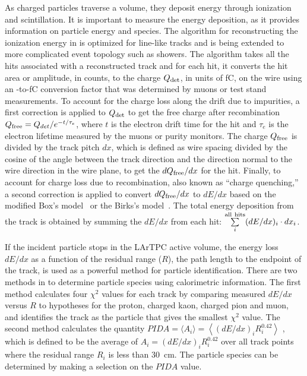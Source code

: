 As charged particles traverse a \lar{} volume, they deposit energy through ionization and scintillation. It is important to measure the energy deposition, as it provides information on particle energy and species. The algorithm for reconstructing the ionization energy in  is optimized for line-like tracks and is being extended to more complicated event topology such as showers. The algorithm takes all the hits associated with a reconstructed track and for %
each hit, it converts the hit area or amplitude, in  counts, %
to the charge $Q_{\rm det}$, in units of \si{\femto\coulomb}, on the wire using an -to-\si{\femto\coulomb} conversion factor that was determined by muons or test stand measurements. To account for the charge loss along the drift due to impurities, a first correction is applied to $Q_{\rm det}$ to get the free charge after recombination $Q_{\rm free} = Q_{det}/e^{-t/\tau_{e}}$, where $t$ is the electron drift time for the hit and $\tau_{e}$ is the electron lifetime measured by the muons or purity monitors. The charge $Q_{\rm{free}}$ is divided by the track pitch $dx$, which is defined as wire spacing divided by the cosine of the angle between the track direction and the direction normal to the wire direction in the wire plane, to get the $dQ_{\rm{free}}/dx$ for the hit. Finally, to account for charge loss due to recombination, also known as ``charge quenching,'' a second correction is applied to convert $dQ_{\rm{free}}/dx$ to $dE/dx$ based on the modified Box's model~ \cite{Acciarri:2013met} or the Birks's model~\cite{Amoruso:2004dy}. The total energy deposition from the track is obtained by summing the $dE/dx$ from each hit: $\sum\limits_{i}^{\rm all\ hits}(dE/dx)_{i}\cdot dx_{i}$.

If the incident particle stops in the LArTPC active volume, the energy loss $dE/dx$ as a function of the residual range ($R$), the path length to the endpoint of the track, is used as a powerful method for particle identification. There are two methods in  to determine particle species using calorimetric information. The first method calculates four $\chi^{2}$ values for each track by comparing measured $dE/dx$ %
versus $R$ to hypotheses for the proton, charged kaon, charged pion and muon, and identifies the track as the particle that gives the smallest $\chi^{2}$ value. The second method calculates the quantity $PIDA = \langle A_{i}\rangle = \left\langle(dE/dx)_{i}R_{i}^{0.42}\right\rangle$ \cite{Acciarri:2013met}, which is defined to be the average of $A_{i} = (dE/dx)_{i}R_{i}^{0.42}$ over all track points where the residual range $R_{i}$ is less than \SI{30}{cm}. The particle species can be determined by making a selection on the $PIDA$ value. 

